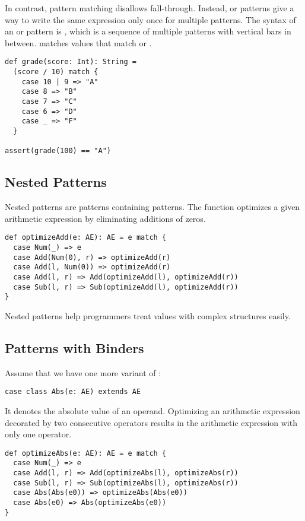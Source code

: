 In contrast, pattern matching disallows fall-through. Instead, or patterns
give a way to write the same expression only once for multiple patterns. The
syntax of an or pattern is , which is a sequence
of multiple patterns with vertical bars in between.  matches values
that match  or .

\begin{verbatim}
def grade(score: Int): String =
  (score / 10) match {
    case 10 | 9 => "A"
    case 8 => "B"
    case 7 => "C"
    case 6 => "D"
    case _ => "F"
  }

assert(grade(100) == "A")
\end{verbatim}

\subsection{Nested Patterns}

Nested patterns are patterns containing patterns.
The  function
optimizes a given arithmetic expression by eliminating additions of zeros.

\begin{verbatim}
def optimizeAdd(e: AE): AE = e match {
  case Num(_) => e
  case Add(Num(0), r) => optimizeAdd(r)
  case Add(l, Num(0)) => optimizeAdd(r)
  case Add(l, r) => Add(optimizeAdd(l), optimizeAdd(r))
  case Sub(l, r) => Sub(optimizeAdd(l), optimizeAdd(r))
}
\end{verbatim}

Nested patterns help programmers treat values with complex structures easily.

\subsection{Patterns with Binders}

Assume that we have one more variant of :

\begin{verbatim}
case class Abs(e: AE) extends AE
\end{verbatim}

It denotes the absolute value of an operand.
Optimizing an arithmetic expression decorated by two
consecutive  operators results in the arithmetic expression with only
one  operator.

\begin{verbatim}
def optimizeAbs(e: AE): AE = e match {
  case Num(_) => e
  case Add(l, r) => Add(optimizeAbs(l), optimizeAbs(r))
  case Sub(l, r) => Sub(optimizeAbs(l), optimizeAbs(r))
  case Abs(Abs(e0)) => optimizeAbs(Abs(e0))
  case Abs(e0) => Abs(optimizeAbs(e0))
}
\end{verbatim}

